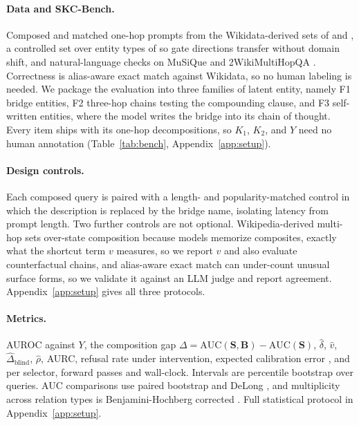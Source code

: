 \documentclass{article}
\newcommand{\gate}{\mathbf{S}}
\newcommand{\bridge}{\mathbf{B}}
\begin{document}
\paragraph{Data and SKC-Bench.}
\label{sec:bench}
Composed and matched one-hop prompts from the Wikidata-derived sets of \citet{yang2024latent} and
\citet{biran2024hopping}, a controlled set over entity types of \citet{ferrando2025entity} so
gate directions transfer without domain shift, and natural-language checks on MuSiQue
\citep{trivedi2022musique} and 2WikiMultiHopQA \citep{ho2020constructing}. Correctness is alias-aware
exact match against Wikidata, so no human labeling is needed. We package the evaluation into three
families of latent entity, namely F1 bridge entities, F2 three-hop chains testing the compounding
clause, and F3 self-written entities, where the model writes the bridge into its chain of thought.
Every item ships with its one-hop decompositions, so $K_1$, $K_2$, and $Y$ need no human annotation
(Table~\ref{tab:bench}, Appendix~\ref{app:setup}).

\paragraph{Design controls.} Each composed query is paired with a length- and popularity-matched
control in which the description is replaced by the bridge name, isolating latency from prompt
length. Two further controls are not optional. Wikipedia-derived multi-hop sets over-state
composition because models memorize composites, exactly what the shortcut term $v$ measures, so we
report $v$ and also evaluate counterfactual chains, and alias-aware exact match can under-count
unusual surface forms, so we validate it against an {LLM} judge \citep{zheng2023judge} and report
agreement. Appendix~\ref{app:setup} gives all three protocols.

\paragraph{Metrics.} AUROC against $Y$, the composition gap
$\Delta=\mathrm{AUC}(\gate,\bridge)-\mathrm{AUC}(\gate)$, $\hat\delta$, $\hat v$,
$\hat\Delta_{\mathrm{blind}}$, $\hat\rho$, AURC, refusal rate under intervention, expected
calibration error \citep{guo2017calibration}, and per selector, forward passes and wall-clock.
Intervals are percentile bootstrap over queries. AUC comparisons use paired bootstrap and DeLong
\citep{delong1988comparing}, and multiplicity across relation types is Benjamini-Hochberg corrected
\citep{benjamini1995controlling}. Full statistical protocol in Appendix~\ref{app:setup}.
\end{document}
